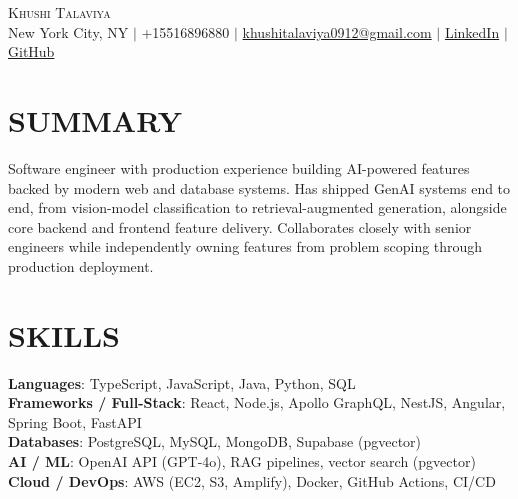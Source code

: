 \documentclass[letterpaper,11pt]{article}
\begin{document}
\begin{center}
    {\Huge \scshape Khushi Talaviya} \\ \vspace{2pt}
    \vspace{4pt}
    \small
    New York City, NY $|$
    \small
    +15516896880 $|$
    \href{mailto:khushitalaviya0912@gmail.com}{khushitalaviya0912@gmail.com} $|$
    \href{https://www.linkedin.com/in/khushitalaviya/}{LinkedIn} $|$
    \href{https://github.com/talaviyakhushi}{GitHub}
\end{center}

\section{SUMMARY}
\vspace{5pt}
\small{Software engineer with production experience building AI-powered features backed by modern web and database systems. Has shipped GenAI systems end to end, from vision-model classification to retrieval-augmented generation, alongside core backend and frontend feature delivery. Collaborates closely with senior engineers while independently owning features from problem scoping through production deployment.}

\vspace{2pt}
\section{SKILLS}
\vspace{5pt}
\begin{itemize}[leftmargin=0in, label={}]
\small{\item{
\textbf{Languages}{: TypeScript, JavaScript, Java, Python, SQL} \\
\textbf{Frameworks / Full-Stack}{: React, Node.js, Apollo GraphQL, NestJS, Angular, Spring Boot, FastAPI} \\
\textbf{Databases}{: PostgreSQL, MySQL, MongoDB, Supabase (pgvector)} \\
\textbf{AI / ML}{: OpenAI API (GPT-4o), RAG pipelines, vector search (pgvector)} \\
\textbf{Cloud / DevOps}{: AWS (EC2, S3, Amplify), Docker, GitHub Actions, CI/CD}
}}
\end{itemize}
\vspace{-10pt}

\end{document}
